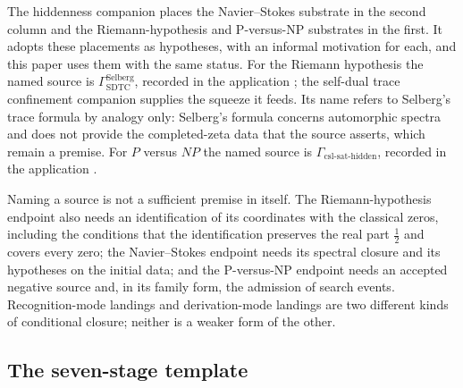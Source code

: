 The hiddenness companion places the Navier--Stokes substrate in the
second column and the Riemann-hypothesis and P-versus-NP substrates in
the first.  It adopts these placements as hypotheses, with an informal
motivation for each, and this paper uses them with the same status.
For the Riemann hypothesis the named source is
\(\Gamma_{\mathrm{SDTC}}^{\mathrm{Selberg}}\), recorded in the
application \cite{Tsiokos2026RH}; the self-dual trace confinement
companion \cite{Tsiokos2026SDTC} supplies the squeeze it feeds.  Its name refers to Selberg's trace
formula \cite{Selberg1956TraceFormula} by analogy only: Selberg's
formula concerns automorphic spectra and does not provide the
completed-zeta data that the source asserts, which remain a premise.
For \(P\) versus \(NP\) the named source is
\(\Gamma_{\mathrm{csl\text{-}sat\text{-}hidden}}\), recorded in the
application \cite{Tsiokos2026PvNP}.

Naming a source is not a sufficient premise in itself.  The
Riemann-hypothesis endpoint also needs an identification of its
coordinates with the classical zeros, including the conditions that
the identification preserves the real part \(\frac12\) and covers every
zero; the Navier--Stokes endpoint needs its spectral closure and its
hypotheses on the initial data; and the P-versus-NP endpoint needs an
accepted negative source and, in its family form, the admission of
search events.  Recognition-mode landings and derivation-mode landings
are two different kinds of conditional closure; neither is a weaker
form of the other.

\subsection{The seven-stage template}\label{sec:recognition:template-applicability}

